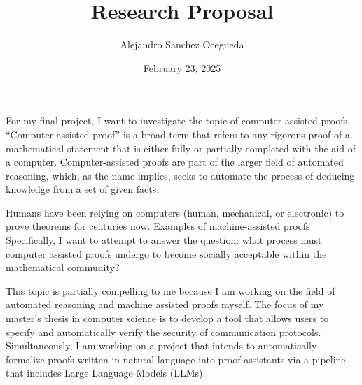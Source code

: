 \documentclass[a4paper]{article}
\title{Research Proposal}
\author{Alejandro Sanchez Ocegueda}
\date{February 23, 2025}
\begin{document}
\maketitle


For my final project, I want to investigate the topic of computer-assisted proofs.
``Computer-assisted proof'' is a broad term that refers to any rigorous proof of a mathematical statement that is either fully or partially completed with the aid of a computer.
Computer-assisted proofs are part of the larger field of automated reasoning, which, as the name implies, seeks to automate the process of deducing knowledge from a set of given facts.

Humans have been relying on computers (human, mechanical, or electronic) to prove theorems for centuries now.
Examples of machine-assisted proofs
Specifically, I want to attempt to answer the question: 
what process must computer assisted proofs undergo to become socially acceptable within the mathematical community?

This topic is partially compelling to me because I am working on the field of automated reasoning and machine assisted proofs myself.
The focus of my master's thesis in computer science is to develop a tool that allows users to specify and automatically verify the security of communication protocols.
Simultaneously, I am working on a project that intends to automatically formalize proofs written in natural language into proof assistants via a pipeline that includes Large Language Models (LLMs).
\end{document}
